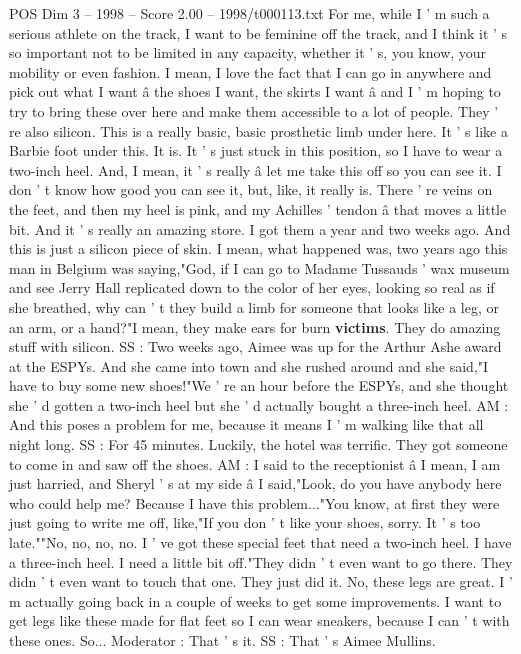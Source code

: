 \begin{textsample}{POS Dim 3 – 1998 – Score 2.00 – 1998/t000113.txt}
For me, while I ' m such a serious athlete on the track, I want to be feminine off the track, and I think it ' s so important not to be limited in any capacity, whether it ' s, you know, your mobility or even fashion.
I mean, I love the fact that I can go in anywhere and pick out what I want â the shoes I want, the skirts I want â and I ' m hoping to try to bring these over here and make them accessible to a lot of people.
They ' re also silicon.
This is a really basic, basic prosthetic limb under here.
It ' s like a Barbie foot under this.
It is.
It ' s just stuck in this position, so I have to wear a two-inch heel.
And, I mean, it ' s really â let me take this off so you can see it.
I don ' t know how good you can see it, but, like, it really is.
There ' re veins on the feet, and then my heel is pink, and my Achilles ' tendon â that moves a little bit.
And it ' s really an amazing store.
I got them a year and two weeks ago.
And this is just a silicon piece of skin.
I mean, what happened was, two years ago this man in Belgium was saying,"God, if I can go to Madame Tussauds ' wax museum and see Jerry Hall replicated down to the color of her eyes, looking so real as if she breathed, why can ' t they build a limb for someone that looks like a leg, or an arm, or a hand?"I mean, they make ears for burn \textbf{victims}.
They do amazing stuff with silicon.
SS : Two weeks ago, Aimee was up for the Arthur Ashe award at the ESPYs.
And she came into town and she rushed around and she said,"I have to buy some new shoes!"We ' re an hour before the ESPYs, and she thought she ' d gotten a two-inch heel but she ' d actually bought a three-inch heel.
AM : And this poses a problem for me, because it means I ' m walking like that all night long.
SS : For 45 minutes.
Luckily, the hotel was terrific.
They got someone to come in and saw off the shoes.
AM : I said to the receptionist â I mean, I am just harried, and Sheryl ' s at my side â I said,"Look, do you have anybody here who could help me?
Because I have this problem..."You know, at first they were just going to write me off, like,"If you don ' t like your shoes, sorry.
It ' s too late.""No, no, no, no.
I ' ve got these special feet that need a two-inch heel.
I have a three-inch heel.
I need a little bit off."They didn ' t even want to go there.
They didn ' t even want to touch that one.
They just did it.
No, these legs are great.
I ' m actually going back in a couple of weeks to get some improvements.
I want to get legs like these made for flat feet so I can wear sneakers, because I can ' t with these ones.
So...
Moderator : That ' s it.
SS : That ' s Aimee Mullins.

\end{textsample}
